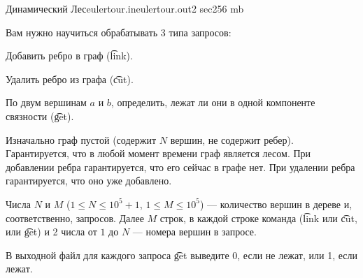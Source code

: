 \begin{problem}{Динамический Лес}{eulertour.in}{eulertour.out}{2 sec}{256 mb}

Вам нужно научиться обрабатывать 3 типа запросов:

\begin{shortnums}
  \item Добавить ребро в граф (\t{link}).
  \item Удалить ребро из графа (\t{cut}).
  \item По двум вершинам $a$ и $b$, определить, лежат ли они в одной компоненте связности (\t{get}).
\end{shortnums}

\vspace*{-1em}
Изначально граф пустой (содержит $N$ вершин, не содержит ребер).
Гарантируется, что в любой момент времени граф является лесом. При добавлении ребра гарантируется,
что его сейчас в графе нет. При удалении ребра гарантируется, что оно уже добавлено.

\InputFile

Числа $N$ и $M$ ($1 \le N \le 10^5 + 1$, $1 \le M \le 10^5$) --- количество вершин в дереве и, соответственно, запросов.
Далее $M$ строк, в каждой строке команда (\t{link} или \t{cut}, или \t{get}) и 2 числа от $1$ до $N$ ---
номера вершин в запросе.

\OutputFile

В выходной файл для каждого запроса \t{get} выведите 0, если не лежат, или 1, если лежат.

\Example

\begin{example}
%
%
\end{example}

\end{problem}                           
